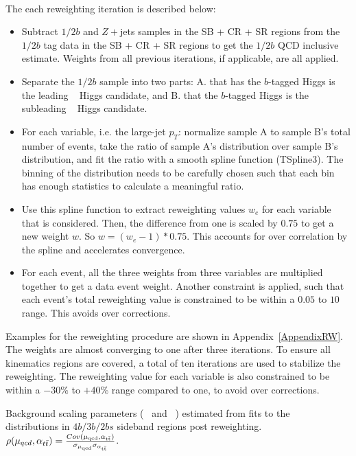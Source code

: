 \paragraph{}
The each reweighting iteration is described below:
\begin{itemize}
  \item Subtract $1/2b$ \ttbar and $Z+$jets samples in the SB + CR + SR regions from the $1/2b$ tag data in the SB + CR + SR regions to get the $1/2b$ QCD inclusive estimate. Weights from all previous iterations, if applicable, are all applied.
  \item Separate the $1/2b$ sample into two parts: A. that has the $b$-tagged Higgs is the leading \pt~ Higgs candidate, and B. that the $b$-tagged Higgs is the subleading \pt~ Higgs candidate.
  \item For each variable, i.e. the large-\R jet $p_{T}$: normalize sample A to sample B's total number of events, take the ratio of sample A's distribution over sample B's distribution, and fit the ratio with a smooth spline function (TSpline3). The binning of the distribution needs to be carefully chosen such that each bin has enough statistics to calculate a meaningful ratio.
  \item Use this spline function to extract reweighting values $w_{e}$ for each variable that is considered. Then, the difference from one is scaled by $0.75$ to get a new weight $w$. So $w = (w_{e} - 1) * 0.75$. This accounts for over correlation by the spline and accelerates convergence.
  \item For each event, all the three weights from three variables are multiplied together to get a data event weight. Another constraint is applied, such that each event's total reweighting value is constrained to be within a $0.05$ to $10$ range. This avoids over corrections.
\end{itemize}
Examples for the reweighting procedure are shown in Appendix~\ref{AppendixRW}.
The weights are almost converging to one after three iterations.
To ensure all kinematics regions are covered, a total of ten iterations are used to stabilize the reweighting. 
The reweighting value for each variable is also constrained to be within a $-30\%$ to $+40\%$ range compared to one, to avoid over corrections.

\begin{table}[htb!]
\begin{center}
\caption{Background scaling parameters (\muqcd~ and \alphatt~) estimated from fits to the \mleadJ~ distributions in $4b/3b/2bs$ sideband regions post reweighting. $\rho(\mu_{qcd},\alpha_{t\bar{t}}) = \frac{Cov(\rm \mu_{qcd},\rm \alpha_{\rm t\bar{t}})}{\rm \sigma_{\mu_{qcd}} \rm \sigma_{\alpha_{\rm t\bar{t}}} }$.}

\label{tab:bkgfit}
\end{center}
\end{table}

